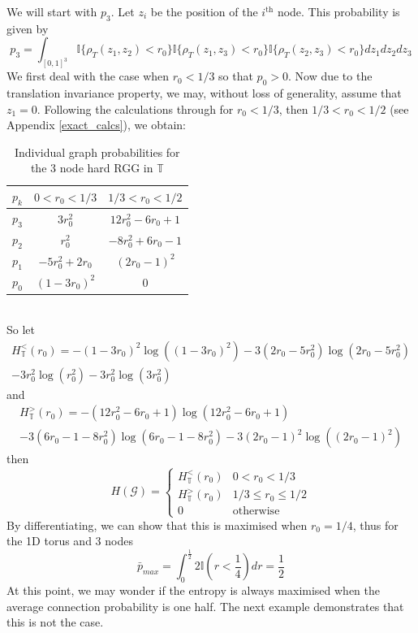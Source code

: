 \documentclass{article}
\begin{document}
We will start with $p_3$. Let $z_i$ be the position of the $i^{\text{th}}$ node. This probability is given by
\begin{equation}
    p_3 = \int_{[0,1]^3} \mathbb{I}\{\rho_T(z_1,z_2)<r_0\}\mathbb{I}\{\rho_T(z_1,z_3)<r_0\}\mathbb{I}\{\rho_T(z_2,z_3)<r_0\}dz_1dz_2dz_3
\end{equation}
 We first deal with the case when $r_0 < 1/3$ so that $p_0 > 0$. Now due to the translation invariance property, we may, without loss of generality, assume that $z_1 = 0$. Following the calculations through for $r_0 < 1/3$, then $1/3 < r_0 < 1/2$ (see Appendix \ref{exact_calcs}), we obtain:
\begin{table}[ht]
    \centering
    {\renewcommand{\arraystretch}{1.5}
    \begin{tabular}{ccc} \hline
        $p_k$ & $0< r_0 < 1/3$ & $1/3< r_0 < 1/2$ \\ \hline
        $p_3$ & $3r_0^2$ & $12r_0^2-6r_0+1$ \\
        $p_2$ & $r_0^2$ & $-8r_0^2+6r_0-1$ \\
        $p_1$ & $-5r_0^2+2r_0$ & $(2r_0-1)^2$ \\
        $p_0$ & $(1-3r_0)^2$ & $0$ \\ \hline
    \end{tabular}}
    \caption{Individual graph probabilities for the 3 node hard RGG in $\mathbb{T}$}
    \label{tab:torus_exact}
\end{table}\\
So let
\begin{gather}
H_{\mathbb{T}}^<(r_0) = -(1-3r_0)^2\log((1-3r_0)^2) - 3(2r_0-5r_0^2)\log(2r_0-5r_0^2) \nonumber \\- 3r_0^2\log(r_0^2) - 3r_0^2\log(3r_0^2)
\end{gather}
and
\begin{gather}
H_{\mathbb{T}}^>(r_0) = - (12r_0^2-6r_0+1)\log(12r_0^2-6r_0+1) \nonumber \\
- 3(6r_0 - 1 - 8r_0^2)\log(6r_0 - 1 - 8r_0^2) - 3(2r_0-1)^2\log((2r_0-1)^2)
\end{gather}
then
\begin{equation}
    H(\mathcal{G}) = \begin{cases}
    H_{\mathbb{T}}^<(r_0) & 0 < r_0 < 1/3 \\
    H_{\mathbb{T}}^>(r_0) & 1/3 \leq r_0 \leq 1/2 \\
    0 & \text{otherwise}
   \end{cases}
\end{equation}
By differentiating, we can show that this is maximised when $r_0 = 1/4$, thus for the 1D torus and 3 nodes
\[
\bar{p}_{max} = \int_0^{\frac{1}{2}} 2\mathbb{I}\left(r < \frac{1}{4}\right) dr = \frac{1}{2}
\]
At this point, we may wonder if the entropy is always maximised when the average connection probability is one half. The next example demonstrates that this is not the case.
\end{document}
